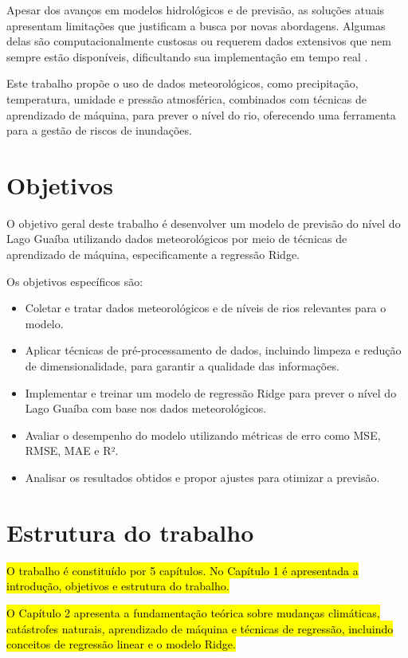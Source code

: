 Apesar dos avanços em modelos hidrológicos e de previsão, as soluções atuais apresentam limitações que justificam a busca por novas abordagens. Algumas delas são computacionalmente custosas ou requerem dados extensivos que nem sempre estão disponíveis, dificultando sua implementação em tempo real \cite{andrade2017}.

Este trabalho propõe o uso de dados meteorológicos, como precipitação, temperatura, umidade e pressão atmosférica, combinados com técnicas de aprendizado de máquina, para prever o nível do rio, oferecendo uma ferramenta para a gestão de riscos de inundações.

\section{Objetivos}

O objetivo geral deste trabalho é desenvolver um modelo de previsão do nível do Lago Guaíba utilizando dados meteorológicos por meio de técnicas de aprendizado de máquina, especificamente a regressão Ridge.

Os objetivos específicos são:

\begin{itemize}
    \item Coletar e tratar dados meteorológicos e de níveis de rios relevantes para o modelo.
    \item Aplicar técnicas de pré-processamento de dados, incluindo limpeza e redução de dimensionalidade, para garantir a qualidade das informações.
    \item Implementar e treinar um modelo de regressão Ridge para prever o nível do Lago Guaíba com base nos dados meteorológicos.
    \item Avaliar o desempenho do modelo utilizando métricas de erro como MSE, RMSE, MAE e R².
    \item Analisar os resultados obtidos e propor ajustes para otimizar a previsão.
\end{itemize}

\section{Estrutura do trabalho}

\hl{O trabalho é constituído por 5 capítulos. No Capítulo 1 é apresentada a introdução, objetivos e estrutura do trabalho.}

\hl{O Capítulo 2 apresenta a fundamentação teórica sobre mudanças climáticas, catástrofes naturais, aprendizado de máquina e técnicas de regressão, incluindo conceitos de regressão linear e o modelo Ridge.}

